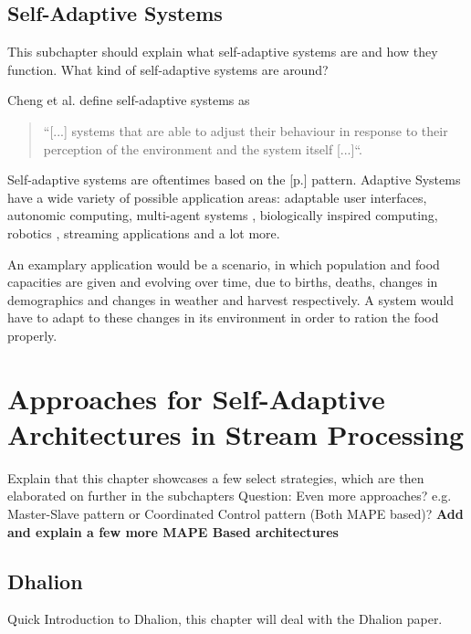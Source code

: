     
    \section{Self-Adaptive Systems}
    This subchapter should explain what self-adaptive systems are and how they function.
    What kind of self-adaptive systems are around?

    Cheng et al. define self-adaptive systems as
    \begin{quotation}
        ``[...] systems that are able to adjust their behaviour in response to their perception of the environment and the
        system itself [...]``\cite[p.1]{Cheng:2009:SES:1573856.1573858}.
    \end{quotation}
    
    Self-adaptive systems are oftentimes based on the  [p.\pageref{cha:MAPE-K}] pattern.
    Adaptive Systems have a wide variety of possible application areas: adaptable user interfaces, autonomic computing, multi-agent systems \cite{Cheng:2009:SES:1573856.1573858}, 
    biologically inspired computing, robotics \cite{10.1007/978-3-319-59480-4_44}, streaming applications and a lot more.

    An examplary application would be a scenario, in which population and food capacities are given and evolving over time, due to births, deaths, changes in demographics 
    and changes in weather and harvest respectively. A system would have to adapt to these changes in its environment in order to ration the food properly.


\chapter{Approaches for Self-Adaptive Architectures in Stream Processing}
Explain that this chapter showcases a few select strategies, which are then elaborated on further in the subchapters
Question: Even more approaches? e.g. Master-Slave pattern or Coordinated Control pattern (Both MAPE based)?
\textbf{Add and explain a few more MAPE Based architectures}

    \section{Dhalion}
    Quick Introduction to Dhalion, this chapter will deal with the Dhalion paper.

